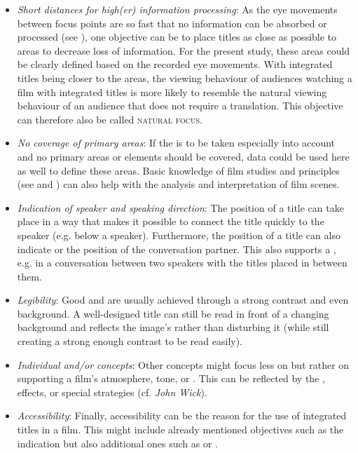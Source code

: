 \sloppy
\begin{itemize}
\item \textit{Short distances for high(er) information processing}: As the eye movements between focus points are so fast that no information can be absorbed or processed (see ), one objective can be to place titles as close as possible to  areas to decrease loss of information. For the present study, these  areas could be clearly defined based on the recorded eye movements. With integrated titles being closer to the  areas, the viewing behaviour of audiences watching a film with integrated titles is more likely to resemble the natural viewing behaviour of an audience that does not require a translation. This objective can therefore also be called \textsc{natural focus}.
\item \textit{No coverage of primary areas}: If the  is to be taken especially into account and no primary areas or elements should be covered,  data could be used here as well to define these areas. Basic knowledge of film studies and  principles (see  and ) can also help with the analysis and interpretation of film scenes.
\item \textit{Indication of speaker and speaking direction}: The position of a title can take place in a way that makes it possible to connect the title quickly to the speaker (e.g. below a speaker). Furthermore, the position of a title can also indicate  or the position of the conversation partner. This also supports a , e.g. in a conversation between two speakers with the titles placed in between them.
\item \textit{Legibility}: Good  and  are usually achieved through a strong contrast and even background. A well-designed title can still be read in front of a changing background and reflects the image’s  rather than disturbing it (while still creating a strong enough contrast to be read easily).
\item \textit{Individual  and/or  concepts}: Other concepts might focus less on  but rather on supporting a film’s atmosphere, tone, or . This can be reflected by the , effects, or special  strategies (cf. \textit{John Wick}).
\item \textit{Accessibility}: Finally, accessibility can be the reason for the use of integrated titles in a film. This might include already mentioned objectives such as the  indication but also additional ones such as  or .
\end{itemize}
\fussy


